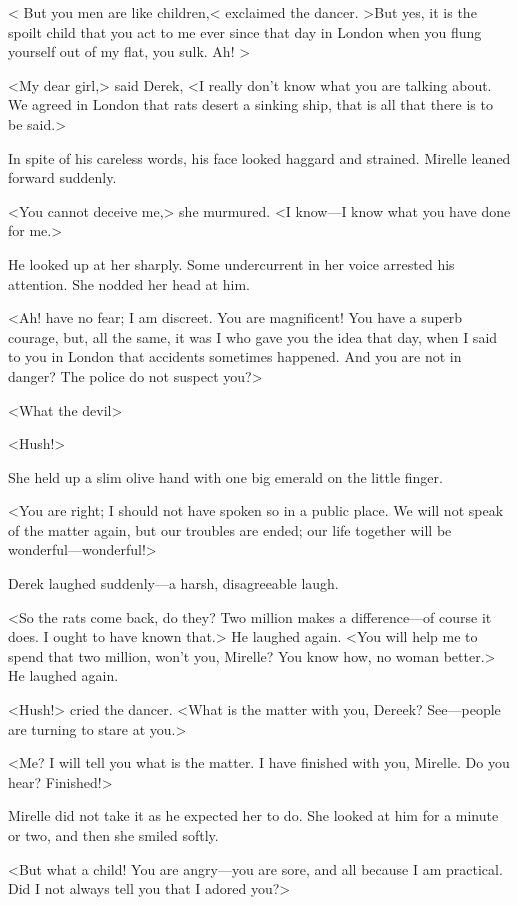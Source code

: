 < But you men are like children,< exclaimed the dancer. >But yes, it is the spoilt child that you act to me ever since that day in London when you flung yourself out of my flat, you sulk. Ah! >


<My dear girl,> said Derek, <I really don't know what you are talking about. We agreed in London that rats desert a sinking ship, that is all that there is to be said.>

In spite of his careless words, his face looked haggard and strained. Mirelle leaned forward suddenly.

<You cannot deceive me,> she murmured. <I know—I know what you have done for me.>

He looked up at her sharply. Some undercurrent in her voice arrested his attention. She nodded her head at him.

<Ah! have no fear; I am discreet. You are magnificent! You have a superb courage, but, all the same, it was I who gave you the idea that day, when I said to you in London that accidents sometimes happened. And you are not in danger? The police do not suspect you?>

<What the devil\longdash>

<Hush!>

She held up a slim olive hand with one big emerald on the little finger.

<You are right; I should not have spoken so in a public place. We will not speak of the matter again, but our troubles are ended; our life together will be wonderful—wonderful!>

Derek laughed suddenly—a harsh, disagreeable laugh.

<So the rats come back, do they? Two million makes a difference—of course it does. I ought to have known that.> He laughed again. <You will help me to spend that two million, won't you, Mirelle? You know how, no woman better.> He laughed again.

<Hush!> cried the dancer. <What is the matter with you, Dereek? See—people are turning to stare at you.>

<Me? I will tell you what is the matter. I have finished with you, Mirelle. Do you hear? Finished!>

Mirelle did not take it as he expected her to do. She looked at him for a minute or two, and then she smiled softly.

<But what a child! You are angry—you are sore, and all because I am practical. Did I not always tell you that I adored you?>

